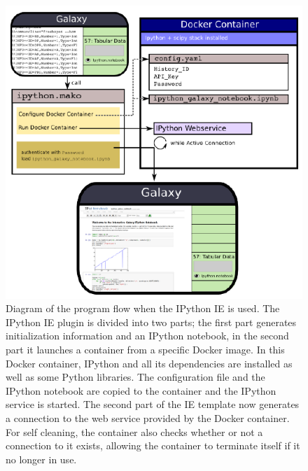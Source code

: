 \documentclass{bioinfo}
\begin{document}
\begin{methods}
\begin{figure}[!tpb]
\centerline{\includegraphics{diagram.pdf}}
\caption{Diagram of the program flow when the IPython IE is used. The IPython IE plugin is divided into two parts;
the first part generates initialization information and an IPython notebook, in the second part it launches a container
from a specific Docker image. In this Docker container, IPython and all its dependencies are installed as well as some Python
libraries. The configuration file and the IPython notebook are copied to the container and the IPython service is started.
The second part of the IE template now generates a connection to the web service provided by the Docker container.
For self cleaning, the container also checks whether or not a connection to it exists, allowing the container to
terminate itself if it no longer in use.}
\label{fig:diagram}
\end{figure}


\end{methods}
\end{document}
